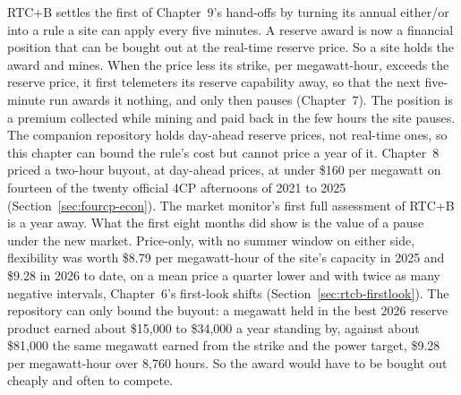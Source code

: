 RTC+B settles the first of Chapter~9's hand-offs by turning its annual either/or into a rule a site can apply every five minutes. A reserve award is now a financial position that can be bought out at the real-time reserve price. So a site holds the award and mines. When the price less its strike, per megawatt-hour, exceeds the reserve price, it first telemeters its reserve capability away, so that the next five-minute run awards it nothing, and only then pauses (Chapter~7). The position is a premium collected while mining and paid back in the few hours the site pauses. The companion repository holds day-ahead reserve prices, not real-time ones, so this chapter can bound the rule's cost but cannot price a year of it. Chapter~8 priced a two-hour buyout, at day-ahead prices, at under \$160 per megawatt on fourteen of the twenty official 4CP afternoons of 2021 to 2025 (Section~\ref{sec:fourcp-econ}). The market monitor's first full assessment of RTC+B is a year away. What the first eight months did show is the value of a pause under the new market. Price-only, with no summer window on either side, flexibility was worth \$8.79 per megawatt-hour of the site's capacity in 2025 and \$9.28 in 2026 to date, on a mean price a quarter lower and with twice as many negative intervals, Chapter~6's first-look shifts (Section~\ref{sec:rtcb-firstlook}). %
The repository can only bound the buyout: a megawatt held in the best 2026 reserve product earned about \$15,000 to \$34,000 a year standing by, against about \$81,000 the same megawatt earned from the strike and the power target, \$9.28 per megawatt-hour over 8,760 hours. So the award would have to be bought out cheaply and often to compete. %
